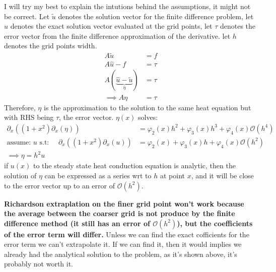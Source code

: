 \documentclass[]{article}
\begin{document}
    \par
    I will try my best to explain the intutions behind the assumptions, it might not be correct. Let $\tilde{u}$ denotes the solution vector for the finite difference problem, let $\hat{u}$ denotes the exact solution vector evaluated at the grid points, let $\tau$ denotes the error vector from the finite difference approximation of the derivative. let $h$ denotes the grid points width. 
    \begin{align*}\tag{3.2}\label{eqn:3.2}
        A\tilde{u} &= f
        \\
        A\hat{u} - f &= \tau
        \\
        A(\underbrace{\hat{u} - \tilde{u}}_{\eta}) &= \tau 
        \\
        \implies 
        A\eta &= \tau
    \end{align*}
    Therefore, $\eta$ is the approximation to the solution to the same heat equation but with RHS being $\tau$, the error vector. $\eta(x)$ solves: 
    \begin{align*}\tag{3.3}\label{eqn:3.3}
        \partial_x((1 + x^2)\partial_x(\eta)) &= \varphi_2(x)h^2 + \varphi_3(x)h^3 + \varphi_4(x)\mathcal{O}(h^4)
        \\
        \text{assume: } u \text{ s.t: }\quad
        \partial_x((1 + x^2)\partial_x(u)) &= \varphi_2(x) + \varphi_3(x)h + \varphi_4(x)\mathcal{O}(h^2)
        \\
        \implies \eta = h^2u
    \end{align*}
    if $u(x)$ to the steady state heat conduction equation is analytic, then the solution of $\eta$ can be expressed as a series wrt to $h$ at point $x$, and it will be close to the error vector up to an error of $\mathcal{O}(h^2)$. 
    \par
    \textbf{Richardson extraplation on the finer grid point won't work because the average between the coarser grid is not produce by the finite difference method (it still has an error of $\mathcal{O}(h^2)$), but the coefficients of the error term will differ.} Unless we can find the exact cofficients for the error term we can't extrapolate it. If we can find it, then it would implies we already had the analytical solution to the problem, as it's shown above, it's probably not worth it. 
\end{document}
